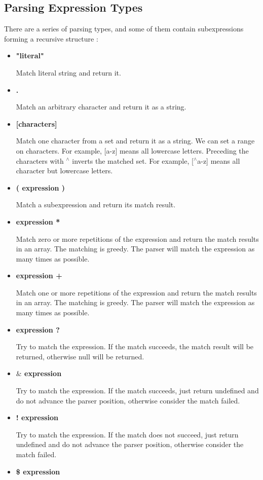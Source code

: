 \subsection {Parsing Expression Types}
There are a series of parsing types, and some of them contain subexpressions forming a recursive structure \cite{pegjs}:

\begin{itemize}
\item\textbf{"literal"}

Match literal string and return it.
\item\textbf{.}

Match an arbitrary character and return it as a string.
\item\textbf{[characters]}

Match one character from a set and return it as a string. We can set a range on characters. For example, [a-z] means all lowercase letters. Preceding the characters with $^\wedge$ inverts the matched set. For example, [$^\wedge$a-z] means all character but lowercase letters.
\item\textbf{( expression )}

Match a subexpression and return its match result.
\item\textbf{expression *}

Match zero or more repetitions of the expression and return the match results in an array. The matching is greedy. The parser will match the expression as many times as possible.
\item\textbf{expression +}

Match one or more repetitions of the expression and return the match results in an array. The matching is greedy. The parser will match the expression as many times as possible.
\item\textbf{expression ?}

Try to match the expression. If the match succeeds, the match result will be returned, otherwise null will be returned.
\item\textbf{$\&$ expression}

Try to match the expression. If the match succeeds, just return undefined and do not advance the parser position, otherwise consider the match failed.
\item\textbf{! expression}

Try to match the expression. If the match does not succeed, just return undefined and do not advance the parser position, otherwise consider the match failed.
\item\textbf{\$ expression}


\end{itemize}
